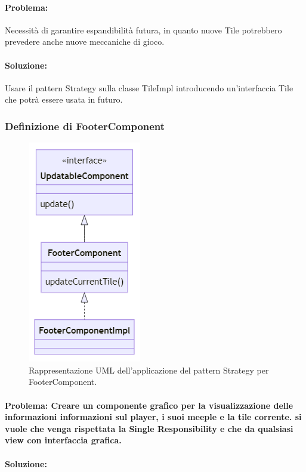 \paragraph{Problema:}
Necessità di garantire espandibilità futura, in quanto nuove Tile potrebbero prevedere anche nuove meccaniche di gioco.
\paragraph{Soluzione:}
Usare il pattern Strategy sulla classe TileImpl introducendo un'interfaccia Tile che potrà essere usata in futuro.
\clearpage

\subsubsection*{Definizione di FooterComponent}
\begin{figure}[ht]
    \centering\includegraphics[]{images/FooterComponent_uml.png}
    \caption{Rappresentazione UML dell'applicazione del pattern Strategy per FooterComponent.}
\end{figure}
\paragraph{Problema: Creare un componente grafico per la visualizzazione delle informazioni informazioni sul player, i suoi meeple e la tile corrente. si vuole che venga rispettata la Single Responsibility e che
da qualsiasi view con interfaccia grafica.}
\paragraph{Soluzione:}

